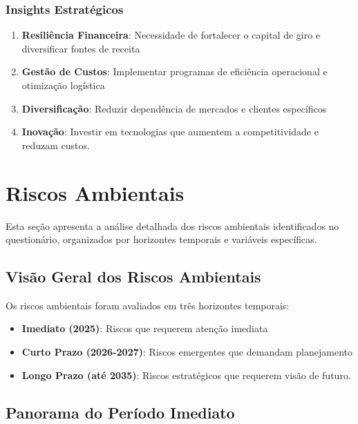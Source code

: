 \documentclass[
  portuguese,
  letterpaper,
  DIV=11,
  numbers=noendperiod]{scrreprt}
\providecommand{\tightlist}{%
  \setlength{\itemsep}{0pt}\setlength{\parskip}{0pt}}
\begin{document}
\subsection{Insights Estratégicos}\label{insights-estratuxe9gicos}

\begin{enumerate}
\def\labelenumi{\arabic{enumi}.}
\tightlist
\item
  \textbf{Resiliência Financeira}: Necessidade de fortalecer o capital
  de giro e diversificar fontes de receita
\item
  \textbf{Gestão de Custos}: Implementar programas de eficiência
  operacional e otimização logística
\item
  \textbf{Diversificação}: Reduzir dependência de mercados e clientes
  específicos
\item
  \textbf{Inovação}: Investir em tecnologias que aumentem a
  competitividade e reduzam custos.
\end{enumerate}


\chapter{Riscos Ambientais}\label{riscos-ambientais-1}

Esta seção apresenta a análise detalhada dos riscos ambientais
identificados no questionário, organizados por horizontes temporais e
variáveis específicas.

\section{Visão Geral dos Riscos
Ambientais}\label{visuxe3o-geral-dos-riscos-ambientais}

Os riscos ambientais foram avaliados em três horizontes temporais:

\begin{itemize}
\tightlist
\item
  \textbf{Imediato (2025)}: Riscos que requerem atenção imediata
\item
  \textbf{Curto Prazo (2026-2027)}: Riscos emergentes que demandam
  planejamento
\item
  \textbf{Longo Prazo (até 2035)}: Riscos estratégicos que requerem
  visão de futuro.
\end{itemize}

\section{Panorama do Período
Imediato}\label{panorama-do-peruxedodo-imediato-1}
\end{document}
